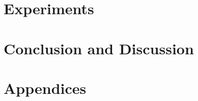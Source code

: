 \documentclass[twoside,11pt]{report}
\begin{document}
\part{Experiments}

    

\part{Conclusion and Discussion}

    
    
    

\part{Appendices}
\begin{appendices}
    
\end{appendices}

\clearpage

\printglossary
\clearpage


\printbibliography
\clearpage
\end{document}
